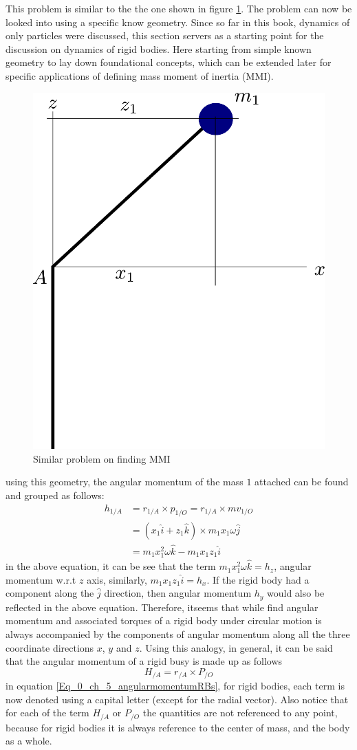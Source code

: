 This problem is similar to the the one shown in figure \ref{Fig_0_ch_5_MMI2}. The problem can now be looked into using a specific know geometry. Since so far in this book, dynamics of only particles were discussed, this section servers as a starting point for the discussion on dynamics of rigid bodies. Here starting from simple known geometry to lay down foundational concepts, which can be extended later for specific applications of defining mass moment of inertia (MMI).
\newpage
\begin{figure}[h!]
	\centering
	\includegraphics[width=0.6\linewidth]{Bilder/21_MMI_2.pdf}
	\caption{Similar problem on finding MMI}
	\label{Fig_0_ch_5_MMI2}
\end{figure}
using this geometry, the angular momentum of the mass $1$ attached can be found and grouped as follows:
\begin{align*}
	h_{1/A} &= r_{1/A} \times p_{1/O} = r_{1/A} \times m v_{1/O} \\
			&= \left( x_{1}\hat{i} + z_{1}\hat{k} \right) \times m_{1} {x}_{1}\omega \hat{j} \\
			&= m_{1}x_{1}^{2}\omega \hat{k} - m_{1}x_{1}z_{1}\hat{i}
\end{align*}
in the above equation, it can be see that the term $m_{1}x_{1}^{2}\omega \hat{k} = h_{z}$, angular momentum w.r.t $z$ axis, similarly, $m_{1}x_{1}z_{1}\hat{i} = h_{x}$. If the rigid body had a component along the $\hat{j}$ direction, then angular momentum $h_{y}$ would also be reflected in the above equation. Therefore, itseems that while find angular momentum and associated torques of a rigid body under circular motion is always accompanied by the components of angular momentum along all the three coordinate directions $x$, $y$ and $z$. Using this analogy, in general, it can be said that the angular momentum of a rigid busy is made up as follows
\begin{equation}\label{Eq_0_ch_5_angularmomentumRBs}
	H_{/A} = r_{/A} \times P_{/O}
\end{equation}
in equation \eqref{Eq_0_ch_5_angularmomentumRBs}, for rigid bodies, each term is now denoted using a capital letter (except for the radial vector). Also notice that for each of the term $H_{/A}$ or $P_{/O}$ the quantities are not referenced to any point, because for rigid bodies it is always reference to the center of mass, and the body as a whole.

